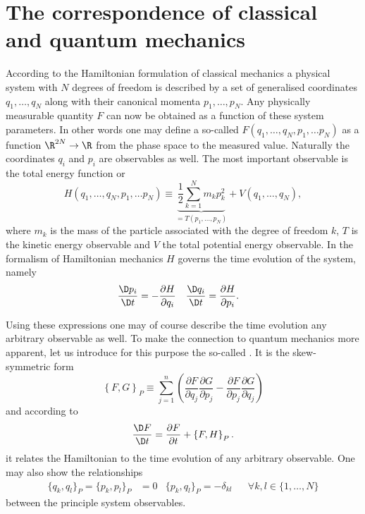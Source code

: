 \section{The correspondence of classical and quantum mechanics}
According to the Hamiltonian formulation of classical mechanics
a physical system with $N$ degrees of freedom
is described by a set of generalised coordinates
$q_1, \ldots, q_N$ along with their canonical momenta $p_1, \ldots, p_N$.
Any physically measurable quantity $F$
can now be obtained as a function of these system parameters.
In other words one may define a so-called 
\newcommand{\clphase}{(q_1, \ldots, q_N, p_1, \ldots p_N)}
$F\clphase$ as a function $\R^{2N} \to \R$
from the phase space to the measured value.
Naturally the coordinates $q_i$ and $p_i$ are observables as well.
The most important observable is the total energy function or 
\begin{equation}
	H\clphase
	\equiv \underbrace{\frac{1}{2} \sum_{k=1}^N m_k p_k^2}_{= T(p_1, \ldots, p_N)}
	+ V(q_1, \ldots, q_N),
	\label{eqn:HamiltonianClassical}
\end{equation}
where $m_k$ is the mass of the particle associated with
the degree of freedom $k$,
$T$ is the kinetic energy observable and $V$ the total potential energy observable.
In the formalism of Hamiltonian mechanics $H$ governs the time evolution
of the system, namely
\begin{align}
	\frac{\D p_i}{\D t} &= - \frac{\partial H}{\partial q_i} &
	\frac{\D q_i}{\D t} &= \frac{\partial H}{\partial p_i}.
	\label{eqn:HamiltonianEqnMotion}
\end{align}

Using these expressions one may of course describe the time evolution
any arbitrary observable as well.
To make the connection to quantum mechanics more apparent,
let us introduce for this purpose the so-called .
It is the skew-symmetric form
\begin{equation}
	\left\{ F, G \right\}_P \equiv \sum_{j=1}^n \left(
	\frac{\partial  F}{\partial q_j} \frac{\partial G}{\partial p_j}
	- \frac{\partial  F}{\partial p_j} \frac{\partial G}{\partial q_j}
	\right)
	\label{eqn:PoissonBracket}
\end{equation}
and according to
\begin{equation}
	\frac{\D F}{\D t} = \frac{\partial F}{\partial t} + \left\{ F, H \right\}_P.
	\label{eqn:PoissonTimeEvolution}
\end{equation}
it relates the Hamiltonian to the time evolution of any arbitrary observable.
One may also show the relationships
\begin{align}
	\{ q_k, q_l \}_P = \{p_k, p_l\}_P &= 0 & \{ p_k, q_l\}_P = - \delta_{kl} &&\forall k,l \in \{1, \ldots, N\}
	\label{eqn:PoissonProperties}
\end{align}
between the principle system observables.

